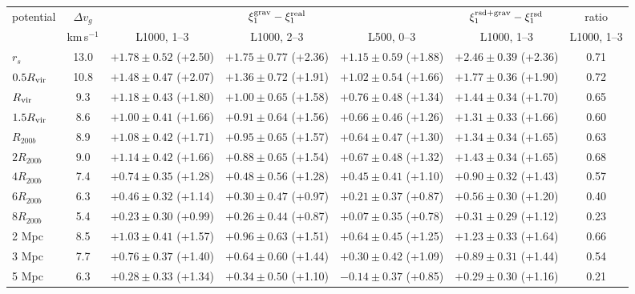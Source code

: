 \begin{tabular}{lcccccc}
\toprule
potential & $\Delta v_g$ & \multicolumn{3}{c}{$\xi_1^{\rm grav}-\xi_1^{\rm real}$} & $\xi_1^{\rm rsd+grav}-\xi_1^{\rm rsd}$ & ratio \\
 & km\,s$^{-1}$ & L1000, 1–3 & L1000, 2–3 & L500, 0–3 & L1000, 1–3 & L1000, 1–3 \\
\midrule
$r_s$ & 13.0 & $+1.78\pm0.52$ (+2.50) & $+1.75\pm0.77$ (+2.36) & $+1.15\pm0.59$ (+1.88) & $+2.46\pm0.39$ (+2.36) & 0.71 \\
$0.5R_{\rm vir}$ & 10.8 & $+1.48\pm0.47$ (+2.07) & $+1.36\pm0.72$ (+1.91) & $+1.02\pm0.54$ (+1.66) & $+1.77\pm0.36$ (+1.90) & 0.72 \\
$R_{\rm vir}$ & 9.3 & $+1.18\pm0.43$ (+1.80) & $+1.00\pm0.65$ (+1.58) & $+0.76\pm0.48$ (+1.34) & $+1.44\pm0.34$ (+1.70) & 0.65 \\
$1.5R_{\rm vir}$ & 8.6 & $+1.00\pm0.41$ (+1.66) & $+0.91\pm0.64$ (+1.56) & $+0.66\pm0.46$ (+1.26) & $+1.31\pm0.33$ (+1.66) & 0.60 \\
$R_{200b}$ & 8.9 & $+1.08\pm0.42$ (+1.71) & $+0.95\pm0.65$ (+1.57) & $+0.64\pm0.47$ (+1.30) & $+1.34\pm0.34$ (+1.65) & 0.63 \\
\midrule
$2R_{200b}$ & 9.0 & $+1.14\pm0.42$ (+1.66) & $+0.88\pm0.65$ (+1.54) & $+0.67\pm0.48$ (+1.32) & $+1.43\pm0.34$ (+1.65) & 0.68 \\
$4R_{200b}$ & 7.4 & $+0.74\pm0.35$ (+1.28) & $+0.48\pm0.56$ (+1.28) & $+0.45\pm0.41$ (+1.10) & $+0.90\pm0.32$ (+1.43) & 0.57 \\
$6R_{200b}$ & 6.3 & $+0.46\pm0.32$ (+1.14) & $+0.30\pm0.47$ (+0.97) & $+0.21\pm0.37$ (+0.87) & $+0.56\pm0.30$ (+1.20) & 0.40 \\
$8R_{200b}$ & 5.4 & $+0.23\pm0.30$ (+0.99) & $+0.26\pm0.44$ (+0.87) & $+0.07\pm0.35$ (+0.78) & $+0.31\pm0.29$ (+1.12) & 0.23 \\
2 Mpc & 8.5 & $+1.03\pm0.41$ (+1.57) & $+0.96\pm0.63$ (+1.51) & $+0.64\pm0.45$ (+1.25) & $+1.23\pm0.33$ (+1.64) & 0.66 \\
3 Mpc & 7.7 & $+0.76\pm0.37$ (+1.40) & $+0.64\pm0.60$ (+1.44) & $+0.30\pm0.42$ (+1.09) & $+0.89\pm0.31$ (+1.44) & 0.54 \\
5 Mpc & 6.3 & $+0.28\pm0.33$ (+1.34) & $+0.34\pm0.50$ (+1.10) & $-0.14\pm0.37$ (+0.85) & $+0.29\pm0.30$ (+1.16) & 0.21 \\
\bottomrule
\end{tabular}
